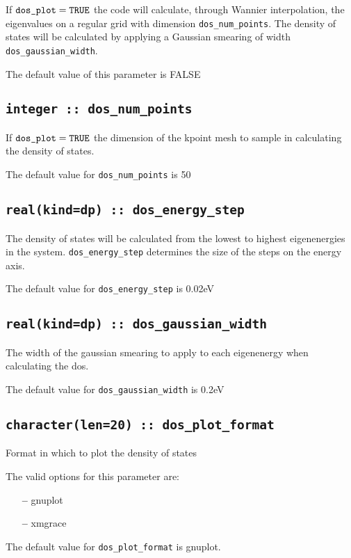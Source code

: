 If $\verb#dos_plot#=\verb#TRUE#$ the code will calculate,
through Wannier interpolation, the
eigenvalues on a regular grid with dimension \verb#dos_num_points#. The
density of states will be calculated by applying a Gaussian smearing of
width \verb#dos_gaussian_width#.

The default value of this parameter is FALSE


\subsection[dos\_num\_points]{\tt integer :: dos\_num\_points}

If $\verb#dos_plot#=\verb#TRUE#$ the dimension of the kpoint mesh
to sample in calculating the density of states.

The default value for \verb#dos_num_points# is 50

\subsection[dos\_energy\_step]{\tt real(kind=dp) :: dos\_energy\_step}

The density of states will be calculated from the
lowest to highest eigenenergies in the system. \verb#dos_energy_step# determines
the size of the steps on the energy axis.

The default value for \verb#dos_energy_step# is 0.02eV

\subsection[dos\_gaussian\_width]{\tt real(kind=dp) :: dos\_gaussian\_width}

The width of the gaussian smearing to apply to each eigenenergy when
calculating the dos.


The default value for \verb#dos_gaussian_width# is 0.2eV

\subsection[dos\_plot\_format]{\tt character(len=20) :: dos\_plot\_format}

Format in which to plot the density of states

The valid options for this parameter are:
\begin{itemize}
\item[{\bf --}] gnuplot
\item[{\bf --}] xmgrace
\end{itemize}

The default value for \verb#dos_plot_format# is gnuplot.

